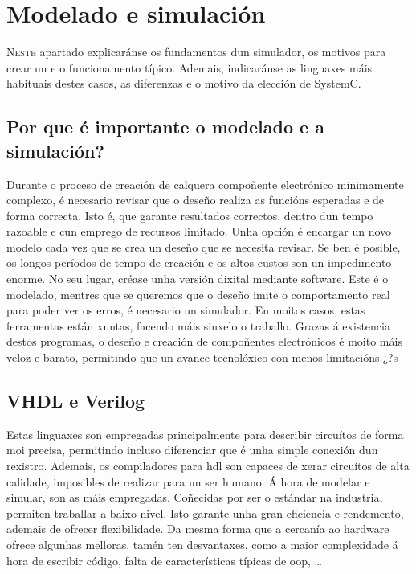 \chapter{Modelado e simulación}
\label{chap:mod_sim}

\lettrine{N}{este} apartado explicaránse os fundamentos dun simulador, os motivos para crear un e o funcionamento típico. Ademais, indicaránse as linguaxes máis habituais destes casos, as diferenzas e o motivo da elección de SystemC. 

\section{Por que é importante o modelado e a simulación?}\label{sec:mod_sim}
Durante o proceso de creación de calquera compoñente electrónico minimamente complexo, é necesario revisar que o deseño realiza as funcións esperadas e de forma correcta. Isto é, que garante resultados correctos, dentro dun tempo razoable e cun emprego de recursos limitado. Unha opción é encargar un novo modelo cada vez que se crea un deseño que se necesita revisar. Se ben é posible, os longos períodos de tempo de creación e os altos custos son un impedimento enorme. No seu lugar, créase unha versión dixital mediante \gls{software}. Este é o modelado, mentres que se queremos que o deseño imite o comportamento real para poder ver os erros, é necesario un simulador. En moitos casos, estas ferramentas están xuntas, facendo máis sinxelo o traballo.
Grazas á existencia destos programas, o deseño e creación de compoñentes electrónicos é moito máis veloz e barato, permitindo que un avance tecnolóxico con menos limitacións.¿?s

\section{VHDL e Verilog}\label{sec:vhdl_verilog}
Estas linguaxes son empregadas principalmente para describir circuítos de forma moi precisa, permitindo incluso diferenciar que é unha simple conexión dun rexistro. Ademais, os compiladores para \acrfull{hdl} son capaces de xerar circuítos de alta calidade, imposibles de realizar para un ser humano. Á hora de modelar e simular, son as máis empregadas. Coñecidas por ser o estándar na industria, permiten traballar a baixo nivel. Isto garante unha gran eficiencia e rendemento, ademais de ofrecer flexibilidade. Da mesma forma que a cercanía ao hardware ofrece algunhas melloras, tamén ten desvantaxes, como a maior complexidade á hora de escribir código, falta de características típicas de \acrfull{oop}, \dots

